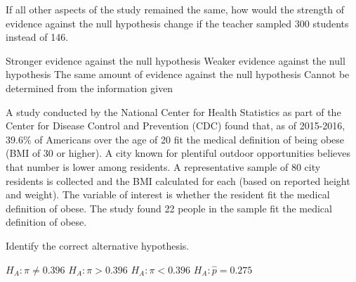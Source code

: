 \documentclass{article}
\begin{document}
\begin{mcquestions}
		\question[follow]  If all other aspects of the study remained the same, how would the strength of evidence against the null hypothesis change if the teacher sampled 300 students instead of 146.\label{r2}
		
		\begin{mcanswerslist}
		\answer[correct] Stronger evidence against the null hypothesis
		\answer Weaker evidence against the null hypothesis
		\answer The same amount of evidence against the null hypothesis
		\answer Cannot be determined from the information given
		\end{mcanswerslist}
		
		\question A study conducted by the National Center for Health Statistics as part of the Center for Disease Control and Prevention (CDC) found that, as of 2015-2016, 39.6\% of Americans over the age of 20 fit the medical definition of being obese (BMI of 30 or higher). A city known for plentiful outdoor opportunities believes that number is lower among residents. A representative sample of 80 city residents is collected and the BMI calculated for each (based on reported height and weight). The variable of interest is whether the resident fit the medical definition of obese. The study found 22 people in the sample fit the medical definition of obese.
		
		Identify the correct alternative hypothesis.
		
		\begin{mcanswerslist}
		\answer \(H_A: \pi \neq 0.396\)
		\answer \(H_A: \pi > 0.396\)
		\answer[correct] \(H_A: \pi < 0.396\)
		\answer \(H_A: \hat p = 0.275\)
		\end{mcanswerslist}
	\end{mcquestions}
		
\end{document}

